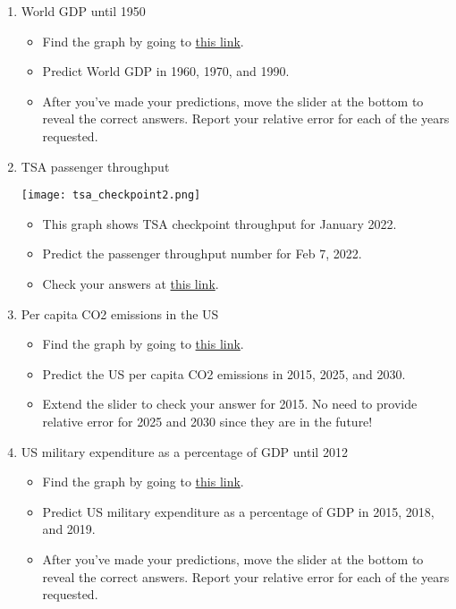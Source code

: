 \documentclass[11pt]{article}
\begin{document}
\begin{enumerate}
	\item World GDP until 1950
	\begin{itemize}
		\item Find the graph by going to \href{https://ourworldindata.org/grapher/world-gdp-over-the-last-two-millennia?time=1..1950}{this link}.
		\item Predict World GDP in 1960, 1970, and 1990.
            \item After you've made your predictions, move the slider at the bottom to reveal the correct answers. Report your relative error for each of the years requested.
	\end{itemize}
	
	\item TSA passenger throughput

	\begin{center}	
		\texttt{[image: tsa\_checkpoint2.png]}
	\end{center}

	\begin{itemize}
		\item This graph shows TSA checkpoint throughput for January 2022.
		\item Predict the passenger throughput number for Feb 7, 2022.
            \item Check your answers at \href{https://www.tsa.gov/travel/passenger-volumes/2022}{this link}.
	\end{itemize}
	
	\item Per capita CO2 emissions in the US
	\begin{itemize}
            \item Find the graph by going to       \href{https://ourworldindata.org/grapher/co-emissions-per-capita?tab=chart&time=1750..2010&country=~USA}{this link}.
		\item Predict the US per capita CO2 emissions in 2015, 2025, and 2030.
            \item Extend the slider to check your answer for 2015. No need to provide relative error for 2025 and 2030 since they are in the future!
	\end{itemize}
	
	\item US military expenditure as a percentage of GDP until 2012
	\begin{itemize}
             \item Find the graph by going to       \href{https://ourworldindata.org/grapher/military-expenditure-share-gdp?tab=chart&time=earliest..2012&country=~USA}{this link}.
		\item Predict US military expenditure as a percentage of GDP in 2015, 2018, and 2019.
            \item After you've made your predictions, move the slider at the bottom to reveal the correct answers. Report your relative error for each of the years requested.
                

\end{itemize}
\end{enumerate}
\end{document}
